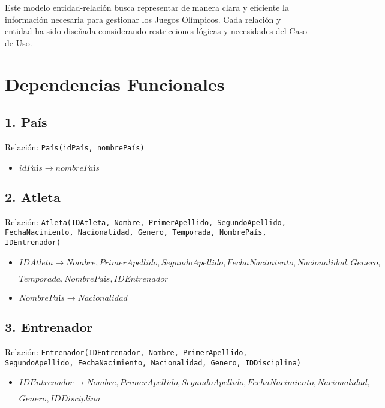 Este modelo entidad-relación busca representar de manera clara y eficiente la información necesaria para gestionar los Juegos Olímpicos. Cada relación y entidad ha sido diseñada considerando restricciones lógicas y necesidades del Caso de Uso.

\section*{Dependencias Funcionales}

\subsection*{1. País}
Relación: \texttt{País(idPaís, nombrePaís)}

\begin{itemize}
    \item $idPaís \rightarrow nombrePaís$
\end{itemize}

\subsection*{2. Atleta}
Relación: \texttt{Atleta(IDAtleta, Nombre, PrimerApellido, SegundoApellido, FechaNacimiento, Nacionalidad, Genero, Temporada, NombrePaís, IDEntrenador)}

\begin{itemize}
    \item $IDAtleta \rightarrow Nombre, PrimerApellido, SegundoApellido, FechaNacimiento, Nacionalidad, Genero,$

$ Temporada, NombrePaís, IDEntrenador$
    \item $NombrePaís \rightarrow Nacionalidad$
\end{itemize}

\subsection*{3. Entrenador}
Relación: \texttt{Entrenador(IDEntrenador, Nombre, PrimerApellido, SegundoApellido, FechaNacimiento, Nacionalidad, Genero, IDDisciplina)}

\begin{itemize}
    \item $IDEntrenador \rightarrow Nombre, PrimerApellido, SegundoApellido, FechaNacimiento, Nacionalidad, $

$Genero, IDDisciplina$
\end{itemize}

